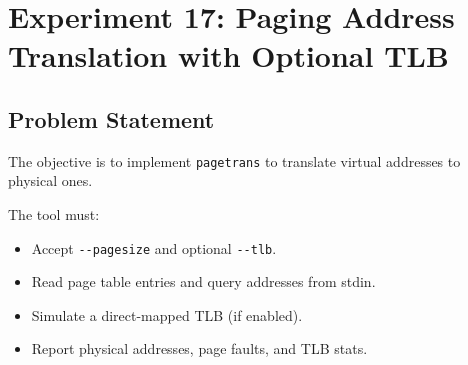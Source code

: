 
\section{Experiment 17: Paging Address Translation with Optional TLB}

\subsection{Problem Statement}
The objective is to implement \texttt{pagetrans} to translate virtual addresses to physical ones.

The tool must:
\begin{itemize}
    \item Accept \verb|--pagesize| and optional \verb|--tlb|.
    \item Read page table entries and query addresses from stdin.
    \item Simulate a direct-mapped TLB (if enabled).
    \item Report physical addresses, page faults, and TLB stats.
\end{itemize}

